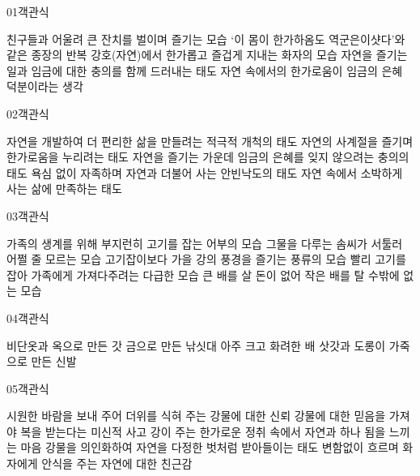 \documentclass[fs85,seriesRus]{korfarm-base}
\begin{document}

\par\medskip
\kfBeginMC
\begin{kfQBlock}{01}{객관식}
\begin{kfChoices}
\kfChoice 친구들과 어울려 큰 잔치를 벌이며 즐기는 모습
\kfChoice ‘이 몸이 한가하옴도 역군은이샷다’와 같은 종장의 반복
\kfChoice 강호(자연)에서 한가롭고 즐겁게 지내는 화자의 모습
\kfChoice 자연을 즐기는 일과 임금에 대한 충의를 함께 드러내는 태도
\kfChoice 자연 속에서의 한가로움이 임금의 은혜 덕분이라는 생각
\end{kfChoices}
\end{kfQBlock}
\begin{kfQBlock}{02}{객관식}
\begin{kfChoices}
\kfChoice 자연을 개발하여 더 편리한 삶을 만들려는 적극적 개척의 태도
\kfChoice 자연의 사계절을 즐기며 한가로움을 누리려는 태도
\kfChoice 자연을 즐기는 가운데 임금의 은혜를 잊지 않으려는 충의의 태도
\kfChoice 욕심 없이 자족하며 자연과 더불어 사는 안빈낙도의 태도
\kfChoice 자연 속에서 소박하게 사는 삶에 만족하는 태도
\end{kfChoices}
\end{kfQBlock}
\begin{kfQBlock}{03}{객관식}
\begin{kfChoices}
\kfChoice 가족의 생계를 위해 부지런히 고기를 잡는 어부의 모습
\kfChoice 그물을 다루는 솜씨가 서툴러 어쩔 줄 모르는 모습
\kfChoice 고기잡이보다 가을 강의 풍경을 즐기는 풍류의 모습
\kfChoice 빨리 고기를 잡아 가족에게 가져다주려는 다급한 모습
\kfChoice 큰 배를 살 돈이 없어 작은 배를 탈 수밖에 없는 모습
\end{kfChoices}
\end{kfQBlock}
\begin{kfQBlock}{04}{객관식}
\begin{kfChoices}
\kfChoice 비단옷과 옥으로 만든 갓
\kfChoice 금으로 만든 낚싯대
\kfChoice 아주 크고 화려한 배
\kfChoice 삿갓과 도롱이
\kfChoice 가죽으로 만든 신발
\end{kfChoices}
\end{kfQBlock}
\begin{kfQBlock}{05}{객관식}
\begin{kfChoices}
\kfChoice 시원한 바람을 보내 주어 더위를 식혀 주는 강물에 대한 신뢰
\kfChoice 강물에 대한 믿음을 가져야 복을 받는다는 미신적 사고
\kfChoice 강이 주는 한가로운 정취 속에서 자연과 하나 됨을 느끼는 마음
\kfChoice 강물을 의인화하여 자연을 다정한 벗처럼 받아들이는 태도
\kfChoice 변함없이 흐르며 화자에게 안식을 주는 자연에 대한 친근감
\end{kfChoices}
\end{kfQBlock}
\end{document}
